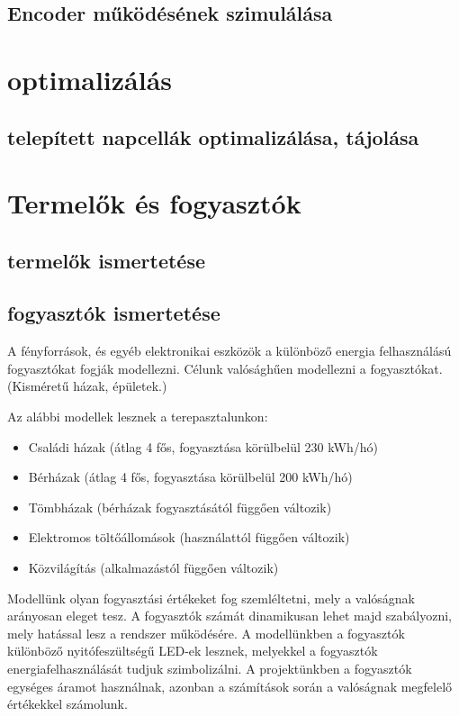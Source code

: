 \documentclass[
]{thesis-ekf}
\theoremstyle{definition}
\theoremstyle{remark}
\begin{document}
		\subsection{Encoder működésének szimulálása}
	\section{optimalizálás}
		\subsection{telepített napcellák optimalizálása, tájolása}
	\section{Termelők és fogyasztók}
		\subsection{termelők ismertetése}
		\subsection{fogyasztók ismertetése}
		\par A fényforrások, és egyéb elektronikai eszközök a különböző energia felhasználású fogyasztókat fogják modellezni. Célunk valósághűen modellezni a fogyasztókat. (Kisméretű házak, épületek.) 
		\par Az alábbi modellek lesznek a terepasztalunkon:
		\begin{itemize}
			\item Családi házak (átlag 4 fős, fogyasztása körülbelül 230 kWh/hó)
			\item Bérházak (átlag 4 fős, fogyasztása körülbelül 200 kWh/hó)
			\item Tömbházak (bérházak fogyasztásától függően változik)
			\item Elektromos töltőállomások (használattól függően változik)
			\item Közvilágítás (alkalmazástól függően változik)
		\end{itemize}
	
		Modellünk olyan fogyasztási értékeket fog szemléltetni, mely a valóságnak arányosan eleget tesz. A fogyasztók számát dinamikusan lehet majd szabályozni, mely hatással lesz a rendszer működésére. A modellünkben a fogyasztók különböző nyitófeszültségű LED-ek lesznek, melyekkel a fogyasztók energiafelhasználását tudjuk szimbolizálni. A projektünkben a fogyasztók egységes áramot használnak, azonban a számítások során a valóságnak megfelelő értékekkel számolunk.
		
\end{document}
